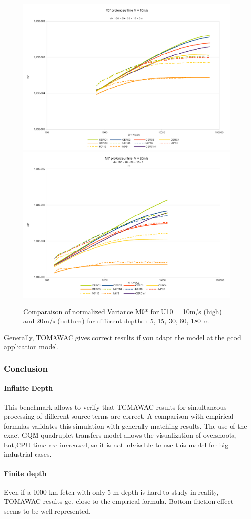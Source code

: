 \begin{figure}
\centering
\includegraphics[scale=0.4]{m0_test7v10.pdf}\\
\includegraphics[scale=0.4]{m0_test7v20.pdf}\\
\caption{Comparaison of normalized Variance M0* for U10 = 10m/s (high) and 20m/s (bottom) for different depths : 5, 15, 30, 60, 180 m}
\label{variancem0}
\end{figure}
Generally, TOMAWAC gives correct results if you adapt the model at the good application model.
\subsubsection{Conclusion}
\paragraph{Infinite Depth}
This benchmark allows to verify that TOMAWAC results for simultaneous processing of different source terms are correct. A comparison with empirical formulas validates this simulation with generally matching results. The use of the exact GQM quadruplet transfers model allows the visualization of overshoots, but,CPU time are increased, so it is not advisable to use this model for big industrial cases.
\paragraph*{Finite depth}
Even if a 1000 km fetch with only 5 m depth is hard to study in reality, TOMAWAC results get close to the empirical formula. Bottom friction effect seems to be well represented.
